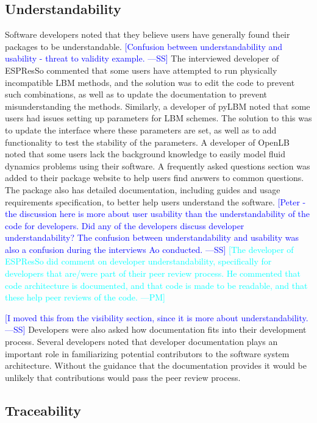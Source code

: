 \documentclass[final, 3p, times, authoryear]{elsarticle}
\newcommand{\authornote}[3]{\textcolor{#1}{[#3 ---#2]}}
\newcommand{\authornote}[3]{}
\newcommand{\wss}[1]{\authornote{blue}{SS}{#1}} %
\newcommand{\pmm}[1]{\authornote{cyan}{PM}{#1}} %
\begin{document}
\subsection{Understandability}

Software developers noted that they believe users have generally found their
packages to be understandable. \wss{Confusion between understandability and
usability - threat to validity example.}  The interviewed developer of ESPResSo
commented that some users have attempted to run physically incompatible LBM
methods, and the solution was to edit the code to prevent such combinations, as
well as to update the documentation to prevent misunderstanding the methods.
Similarly, a developer of pyLBM noted that some users had issues setting up
parameters for LBM schemes. The solution to this was to update the interface
where these parameters are set, as well as to add functionality to test the
stability of the parameters. A developer of OpenLB noted that some users lack
the background knowledge to easily model fluid dynamics problems using their
software. A frequently asked questions section was added to their package
website to help users find answers to common questions. The package also has
detailed documentation, including guides and usage requirements specification,
to better help users understand the software. \wss{Peter - the discussion here
is more about user usability than the understandability of the code for
developers. Did any of the developers discuss developer understandability?  The
confusion between understandability and usability was also a confusion during
the interviews Ao conducted.} \pmm{The developer of ESPResSo did comment on
developer understandability, specifically for developers that are/were part of
their peer review process. He commented that code architecture is documented,
and that code is made to be readable, and that these help peer reviews of the
code.}

\wss{I moved this from the visibility section, since it is more about
understandability.}  Developers were also asked how documentation fits into their
development process. Several developers noted that developer documentation plays
an important role in familiarizing potential contributors to the software system
architecture. Without the guidance that the documentation provides it would be
unlikely that contributions would pass the peer review process. 

\subsection{Traceability}
\end{document}

